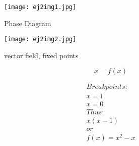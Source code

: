 \documentclass[a4paper,10pt]{article}
\begin{document}
\begin{enumerate}
    
        \begin{figure}[h]
            \centering
            \texttt{[image: ej2img1.jpg]}
            \caption{Phase Diagram}
            \label{fig:mesh1}
        \end{figure}
        \begin{figure}[h]
            \centering
            \texttt{[image: ej2img2.jpg]}
            \caption{vector field, fixed points}
            \label{fig:mesh1}
        \end{figure}
         \begin{equation}
            \dot{x}=f(x)
        \end{equation}
        
        \begin{equation}
            \begin{aligned}
                Break points:\\
                x=1\\
                x=0\\
                Thus:\\
                x(x-1)\\
                or\\
                \boxed{f(x)=x^2-x}
            \end{aligned}
        \end{equation}
        

\end{enumerate}
\end{document}
